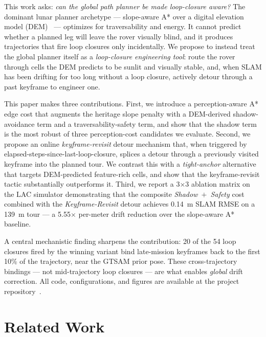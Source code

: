 \documentclass[letterpaper,times]{IONconf}
\begin{document}
This work asks: \emph{can the global path planner be made loop-closure aware?} The dominant lunar planner archetype --- slope-aware A* over a digital elevation model (DEM)~\citep{stanford_aa278_hw3} --- optimizes for traversability and energy. It cannot predict whether a planned leg will leave the rover visually blind, and it produces trajectories that fire loop closures only incidentally. We propose to instead treat the global planner itself as a \emph{loop-closure engineering tool}: route the rover through cells the DEM predicts to be sunlit and visually stable, and, when SLAM has been drifting for too long without a loop closure, actively detour through a past keyframe to engineer one.

This paper makes three contributions. First, we introduce a perception-aware A* edge cost that augments the heritage slope penalty with a DEM-derived shadow-avoidance term and a traversability-safety term, and show that the shadow term is the most robust of three perception-cost candidates we evaluate. Second, we propose an online \emph{keyframe-revisit} detour mechanism that, when triggered by elapsed-steps-since-last-loop-closure, splices a detour through a previously visited keyframe into the planned tour. We contrast this with a \emph{tight-anchor} alternative that targets DEM-predicted feature-rich cells, and show that the keyframe-revisit tactic substantially outperforms it. Third, we report a 3$\times$3 ablation matrix on the LAC simulator demonstrating that the composite \emph{Shadow~$+$~Safety} cost combined with the \emph{Keyframe-Revisit} detour achieves 0.14~m SLAM RMSE on a 139~m tour --- a 5.55$\times$ per-meter drift reduction over the slope-aware A* baseline.

A central mechanistic finding sharpens the contribution: 20 of the 54 loop closures fired by the winning variant bind late-mission keyframes back to the first 10\% of the trajectory, near the GTSAM prior pose. These cross-trajectory bindings --- not mid-trajectory loop closures --- are what enables \emph{global} drift correction. All code, configurations, and figures are available at the project repository~\citep{thorup2026repo}.


\section{Related Work}
\label{sec:related}
\end{document}
